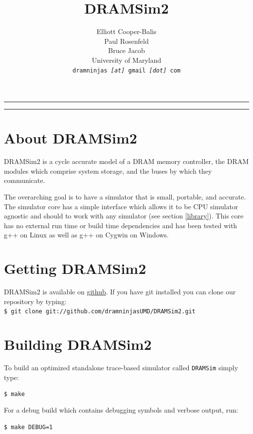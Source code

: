 \documentclass[11pt]{article}
\newcommand{\HRule}{\rule{\linewidth}{0.5mm}}
\begin{document}
\title{DRAMSim2}
\author{Elliott Cooper-Balis \\
			Paul Rosenfeld \\
			Bruce Jacob \\
			University of Maryland \\
			\texttt{\footnotesize dramninjas \textit{[at]} gmail \textit{[dot]} com}
}
\date{}
\maketitle
\HRule
\tableofcontents
\HRule
{}
\section{About DRAMSim2}
	DRAMSim2 is a cycle accurate model of a DRAM memory controller, the DRAM
	modules which comprise system storage, and the buses by which they
	communicate. 

	The overarching goal is to have a simulator that is small,
	portable, and accurate. The simulator core has a simple interface 
	which allows it to be CPU simulator agnostic and should to work with any simulator (see section \ref{library}).  This core has no external run
	time or build time dependencies and has been tested with g++ on Linux
	as well as g++ on Cygwin on Windows.  

\section{Getting DRAMSim2}

DRAMSim2 is available on \href{http://github.com/dramninjasUMD}{github}. If you have git installed you can clone our repository by typing:\\

\texttt{\$ git clone git://github.com/dramninjasUMD/DRAMSim2.git }



\section{Building DRAMSim2}
	To build an optimized standalone trace-based simulator called \texttt{DRAMSim} simply type:

	\texttt{\$ make}

	For a debug build which contains debugging symbols and verbose output, run:

	\texttt{\$ make DEBUG=1}
\end{document}
